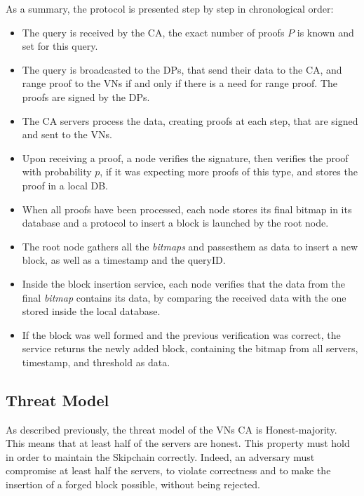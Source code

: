 \documentclass{article}
\begin{document}
As a summary, the protocol is presented step by step in chronological order:
\begin{itemize}
\item{The query is received by the CA, the exact number of proofs $P$ is known and set for this query.}
\item{The query is broadcasted to the DPs, that send their data to the CA, and range proof to the VNs if and only if there is a need for range proof. The proofs are signed by the DPs.}
\item{The CA servers process the data, creating proofs at each step, that are signed and sent to the VNs.}
\item{Upon receiving a proof, a node verifies the signature, then verifies the proof with probability $p$, if it was expecting more proofs of this type,  and stores the proof in a local DB.}
\item{When all proofs have been processed, each node stores its final bitmap in its database and a protocol to insert a block is launched by the root node.}
\item{The root node gathers all the \textit{bitmaps} and passesthem as data to insert a new block, as well as a timestamp and the queryID.}
\item{Inside the block insertion service, each node verifies that the data from the final \textit{bitmap} contains its data, by comparing the received data with the one stored inside the local database.}
\item{If the block was well formed and the previous verification was correct, the service returns the newly added block, containing the bitmap from all servers, timestamp, and threshold as data.}
\end{itemize}
\subsection{Threat Model}
As described previously, the threat model of the VNs CA is Honest-majority. This means that at least half of the servers are honest. This property must hold in order to maintain the Skipchain correctly. Indeed, an adversary must compromise at least half the servers, to violate correctness and to make the insertion of a forged block possible, without being rejected.
\end{document}
